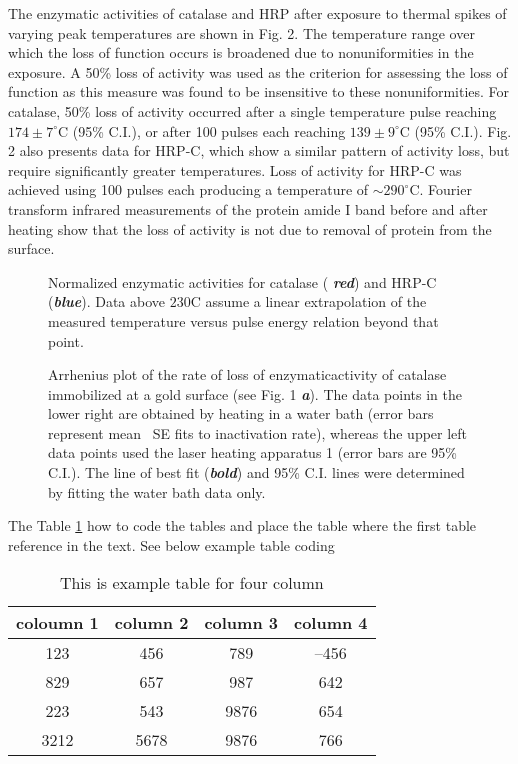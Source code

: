 \documentclass{biophys}
\begin{document}
The enzymatic activities of catalase and HRP after exposure to thermal spikes of varying peak temperatures are shown in Fig. 2. The temperature range over which the loss of function occurs is broadened due to nonuniformities in the exposure. A 50\% loss of activity was used as the criterion for assessing the loss of function as this measure was found to be insensitive to these nonuniformities. For catalase, 50\% loss of activity occurred after a single temperature pulse reaching $174\pm 7^\circ$C (95\% C.I.), or after 100 pulses each reaching $139\pm 9^\circ$C (95\% C.I.). Fig. 2 also presents data for HRP-C, which show a similar pattern of activity loss, but require significantly greater temperatures. Loss of activity for HRP-C was achieved using 100 pulses each producing a temperature of ${\sim}290^\circ$C. Fourier transform infrared  measurements of the protein amide I band before and after heating show that the loss of activity is not due to removal of protein from the surface.

\begin{figure}[b!]
\caption{Normalized enzymatic activities for catalase ({\bfseries\itshape
red}) and HRP-C ({\bfseries\itshape blue}). Data above $\mbox{230}$\textdegree C assume a linear extrapolation of the measured temperature versus pulse energy relation beyond that point.}
\end{figure}

\begin{figure}[t!]
\caption{Arrhenius plot of the rate of loss of enzymatic\break activity of catalase immobilized at a gold surface (see Fig. 1 {\bfseries\itshape a}). The data points in the lower right are obtained by heating in a water bath (error bars represent mean \textpm\ SE fits to inactivation rate), whereas the upper left data points used the laser heating apparatus 1 (error bars are 95\% C.I.). The line of best fit ({\bfseries\itshape bold}) and 95\% C.I. lines were determined by fitting the water bath data only.
}
\end{figure}

The Table \ref{tab1} how to code the tables and place the table where the first
table reference in the text. See below example table coding

\begin{table}[!bht]
\begin{center}
\caption{This is example table for four column}\label{tab1}
\begin{tabular}{cccc}\hline
coloumn 1 & column 2 & column 3 & column 4\\ \hline
123 & 456 & 789 & --456\\
829 & 657 & 987 & 642\\
223 & 543 & 9876& 654\\
3212 & 5678 & 9876 & 766\\ \hline
\end{tabular}
\end{center}
\end{table}
\end{document}
